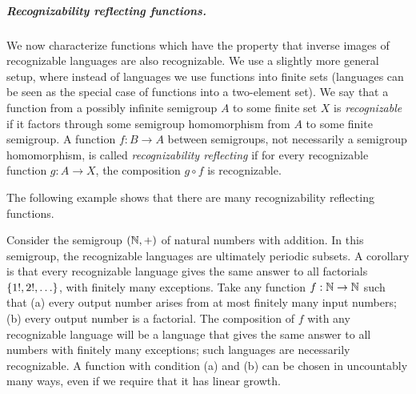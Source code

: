 \subparagraph{Recognizability reflecting functions.} We now characterize functions which have the property that inverse images of recognizable languages are also recognizable. We  use a slightly more general setup, where instead of languages we use functions into finite sets (languages can be seen as the special case of functions into a two-element set).  We say that a function  from a possibly infinite  semigroup $A$ to some finite set $X$ is \emph{recognizable} if it factors through some semigroup homomorphism from $A$ to some finite semigroup. 
 A function $f : B \to A$ between semigroups, not necessarily a semigroup homomorphism, is  called \emph{recognizability reflecting} if for every recognizable function $g : A \to X$, the composition $g \circ f$  is  recognizable.  

The following example shows that there are  many recognizability reflecting functions.

\begin{example}[Factorials]
    Consider the semigroup $({\mathbb N}, +)$ of natural numbers with addition. In this semigroup, the recognizable languages are ultimately periodic subsets. A corollary is that every recognizable language gives the same answer to all factorials $\{1!,2!,\ldots\}$, with finitely many exceptions. Take any function $f : {\mathbb N} \to {\mathbb N}$ such that (a) every output number arises from at most finitely many input numbers; (b) every output number is a factorial.  The composition of $f$ with any recognizable language will be a language that gives the same answer to all numbers with finitely many exceptions; such languages are necessarily recognizable. A function with condition (a) and (b) can be chosen in uncountably many ways, even if we require that it has linear growth.
\end{example}

